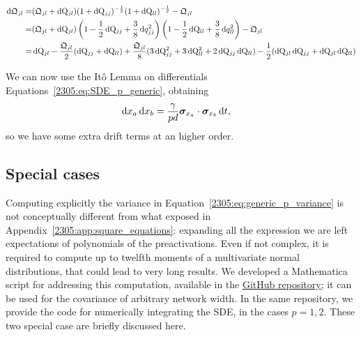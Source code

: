 \[\begin{split}
  \dif\mathfrak{Q}_{jl} =& (\mathfrak{Q}_{jl} +\dif \Q_{jl})(1 +\dif \Q_{jj})^{-\frac12}(1 +\dif \Q_{ll})^{-\frac12} - \mathfrak{Q}_{jl} \\
            =& (\mathfrak{Q}_{jl} +\dif \Q_{jl})\left(1 -\frac12\dif \Q_{jj} + \frac38\dif q^2_{jj}\right)\left(1 -\frac12\dif \Q_{ll} + \frac38\dif q^2_{ll}\right)-\mathfrak{Q}_{jl} \\
            =& \dif \Q_{jl} - \frac{\mathfrak{Q}_{jl}}{2}(\dif \Q_{jj}+\dif \Q_{ll}) + \frac{\mathfrak{Q}_{jl}}{8}(3\dif \Q_{jj}^2+3\dif \Q_{ll}^2 + 2\dif \Q_{jj}\dif \Q_{ll})-\frac12(\dif \Q_{jl}\dif \Q_{jj}+\dif \Q_{jl}\dif \Q_{ll})
\end{split}\]

We can now use the Itô Lemma on differentials Equations~\eqref{2305:eq:SDE_p_generic},
obtaining 
\[
  \dif x_a \dif x_b = \frac{\gamma}{pd}\vec{\sigma}_{x_a} \cdot \vec{\sigma}_{x_b}\dif t, \quad
\]
so we have some extra drift terms at an higher order.

\subsection{Special cases}
Computing explicitly the variance in Equation~\eqref{2305:eq:generic_p_variance} is not conceptually different from what exposed in Appendix~\ref{2305:app:square_equations}: expanding all the expression we are left expectations of polynomials of the preactivations.
Even if not complex, it is required to compute up to twelfth moments of a multivariate normal distributions, that could lead to very long results. We developed a Mathematica script for addressing this computation, available in the \href{https://github.com/IdePHICS/EscapingMediocrity}{GitHub repository}; it can be used for the covariance of arbitrary network width. In the same repository, we provide the code for numerically integrating the SDE, in the cases \(p=1,2\). These two special case are briefly discussed here.


